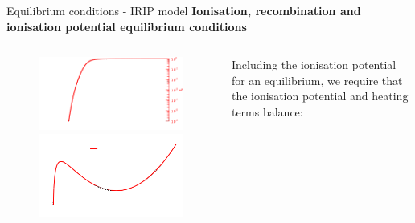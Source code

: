 \documentclass[10pt,aspectratio=169,usenames,dvipsnames]{beamer}
\begin{document}
\begin{frame}{Equilibrium conditions - IRIP model}
\textbf{Ionisation, recombination and ionisation potential equilibrium conditions}
\begin{columns}
\begin{column}{0.45\textwidth}
\begin{figure}
    \centering
    \includegraphics[width=0.95\linewidth]{2023StAndrewsAstro/Figures/eqltest3.png} \\
    \includegraphics[width=0.95\linewidth]{2023StAndrewsAstro/Figures/aa39667-20-fig2.png}
\end{figure}
\end{column}
\begin{column}{0.55\textwidth}
Including the ionisation potential for an equilibrium, we require that the ionisation potential and heating terms balance:
\begin{gather}

\end{gather}
\end{column}
\end{columns}
\end{frame}
\end{document}
